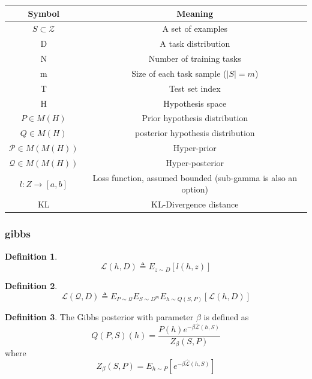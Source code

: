 \documentclass[letterpaper]{article}
\theoremstyle{definition}
\newtheorem{defn}{Definition}[section]
\begin{document}
\begin{tabular} {|c | c|}
	\hline
	Symbol & Meaning \\
	\hline
	$S\subset \mathcal{Z}$ & A set of examples \\
	D & A task distribution\\
	N & Number of training tasks \\
	m & Size of each task sample ($|S|=m$)\\
	T & Test set index \\
	H & Hypothesis space \\
	$P\in M(H)$ & Prior hypothesis distribution \\
	$Q\in M(H)$ & posterior hypothesis distribution \\
	$\mathcal{P} \in M(M(H))$ & Hyper-prior \\
	$\mathcal{Q} \in M(M(H))$ & Hyper-posterior \\
	$l:Z\rightarrow [a,b] $ & Loss function, assumed bounded (sub-gamma is also an option) \\
	KL & KL-Divergence distance\\
	\hline
\end{tabular}

\subsubsection{gibbs} \label{section:result-gibbs}

\begin{defn}
	$$\mathcal{L}(h, D)\triangleq E_{z\sim D}\left [l(h,z)\right ]$$
\end{defn}

\begin{defn}
	$$\mathcal{L}(\mathcal{Q}, D)\triangleq E_{P\sim \mathcal{Q}}E_{S\sim D^m}E_{h\sim Q(S,P)} \left [\mathcal{L}(h, D)\right ]$$
\end{defn}

\begin{defn} \label{defn:Gibbs}
     The Gibbs posterior with parameter $\beta$ is defined as $$Q(P,S)(h)=\frac{P(h)e^{-\beta \hat{\mathcal{L}}(h,S)}}{Z_\beta(S,P)}$$ 
     where 
     $$Z_\beta(S,P)=E_{h\sim P} \left [ e^{-\beta\hat{\mathcal{L}}(h,S)}\right ]$$
\end{defn}
\end{document}
